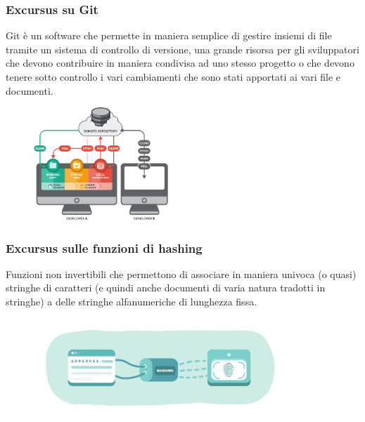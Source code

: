 \documentclass{beamer}
\begin{document}
\begin{frame}
	\frametitle{Excursus su Git}
	Git è un software che permette in maniera semplice di gestire insiemi di file tramite un sistema di controllo di versione, una grande risorsa per gli sviluppatori che devono contribuire in maniera condivisa ad uno stesso progetto o che devono tenere sotto controllo i vari cambiamenti che sono stati apportati ai vari file e documenti.
	\begin{figure}
		\includegraphics[width=0.45\textwidth]{figures/git2.png}
	\end{figure}
\end{frame}
\begin{frame}
	\frametitle{Excursus sulle funzioni di hashing}
	Funzioni non invertibili che permettono di associare in maniera univoca (o quasi) stringhe di caratteri (e quindi anche documenti di varia natura tradotti in stringhe) a delle stringhe alfanumeriche di lunghezza fissa.
	\bigskip
	\begin{figure}
		\includegraphics[width=0.85\textwidth]{figures/hashing.jpg}
	\end{figure}
\end{frame}
\end{document}
